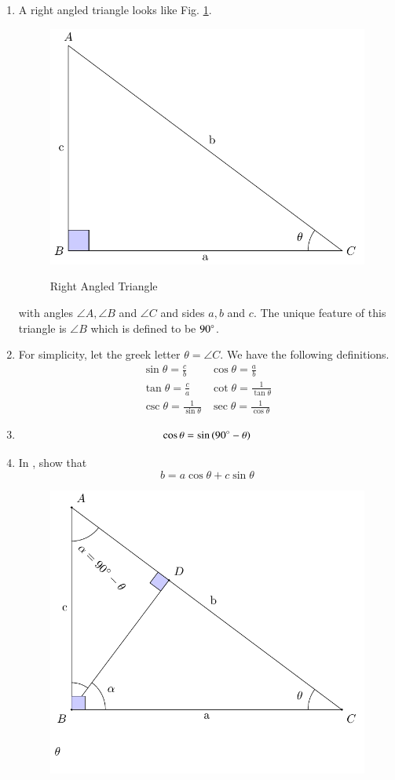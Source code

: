 
\begin{enumerate}[label=\thesubsection.\arabic*.,ref=\thesubsection.\theenumi]
%
	\item 
A right angled triangle looks like Fig. \ref{fig:tri_right_angle}.
\begin{figure}[!ht]
\centering
{\includegraphics[width=0.6\columnwidth]{figs/trig_id/right/tri_right_angle.pdf}}
\caption{Right Angled Triangle}
\label{fig:tri_right_angle}	
\end{figure}
with angles $\angle A,\angle B$ and $\angle C$ and sides $a, b$ and $c$.  The unique feature of this triangle is $\angle B$ which is defined to be $90\degree$.
\item
	For simplicity, let the greek letter $\theta = \angle C$.  We have the following definitions.
\begin{equation}
\label{eq:tri_trig_defs}
\begin{matrix}
	\sin \theta = \frac{c}{b} & 	\cos \theta = \frac{a}{b} \\[1ex]
	\tan \theta = \frac{c}{a} & \cot \theta = \frac{1}{\tan \theta} \\[1ex]
	\csc \theta = \frac{1}{\sin \theta} & \sec \theta = \frac{1}{\cos \theta}
	\end{matrix}
\end{equation}
\item  
	\begin{equation}
	\cos \theta = \sin \left(90\degree - \theta\right)
	\label{eq:tri_baudh_comp}	
	\end{equation}
\item
In  , 
show that 
%
\begin{equation}
\label{ch1_budh_basic}
b = a \cos \theta + c \sin \theta
\end{equation}
%
\begin{figure}[!ht]
	\begin{center}
		{\includegraphics[width=0.6\columnwidth]{figs/trig_id/right/tri_baudh.pdf}}

\end{center}
\end{figure}
\end{enumerate}
